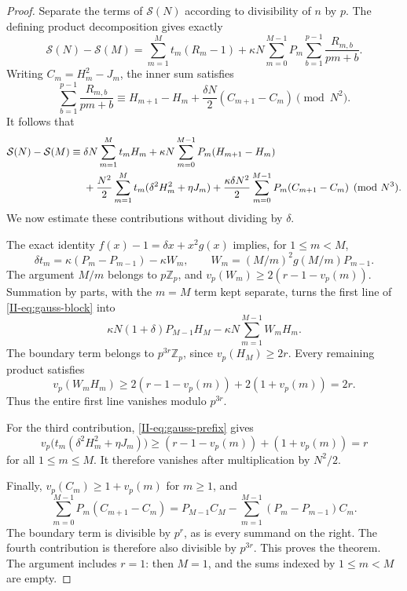 \documentclass[11pt,letterpaper]{article}
\numberwithin{equation}{section}
\begin{document}
\begin{proof}
Separate the terms of $\mathcal S(N)$ according to divisibility of
$n$ by $p$. The defining product decomposition gives exactly
\[
\mathcal S(N)-\mathcal S(M)
=\sum_{m=1}^{M}t_m(R_m-1)
+\kappa N\sum_{m=0}^{M-1}P_m
 \sum_{b=1}^{p-1}\frac{R_{m,b}}{pm+b}.
\]
Writing $C_m=H_m^2-J_m$, the inner sum satisfies
\[
\sum_{b=1}^{p-1}\frac{R_{m,b}}{pm+b}
\equiv H_{m+1}-H_m+\frac{\delta N}{2}(C_{m+1}-C_m)
\pmod{N^2}.
\]
It follows that
\begin{align}\label{II-eq:gauss-block}
\mathcal S(N)-\mathcal S(M)\equiv{}&
\delta N\sum_{m=1}^{M}t_mH_m
+\kappa N\sum_{m=0}^{M-1}P_m(H_{m+1}-H_m)\notag\\
&+\frac{N^2}{2}\sum_{m=1}^{M}t_m(\delta^2H_m^2+\eta J_m)
+\frac{\kappa\delta N^2}{2}
 \sum_{m=0}^{M-1}P_m(C_{m+1}-C_m)
\pmod{N^3}.
\end{align}
We now estimate these contributions without dividing by $\delta$.

The exact identity $f(x)-1=\delta x+x^2g(x)$ implies,
for $1\leq m<M$,
\[
\delta t_m
=\kappa(P_m-P_{m-1})-\kappa W_m,
\qquad
W_m=(M/m)^2g(M/m)P_{m-1}.
\]
The argument $M/m$ belongs to $p\mathbb Z_p$, and
$v_p(W_m)\geq2(r-1-v_p(m))$. Summation by parts, with the
$m=M$ term kept separate, turns the first line of
\eqref{II-eq:gauss-block} into
\[
\kappa N(1+\delta)P_{M-1}H_M
-\kappa N\sum_{m=1}^{M-1}W_mH_m.
\]
The boundary term belongs to $p^{3r}\mathbb Z_p$, since
$v_p(H_M)\geq2r$. Every remaining product satisfies
\[
v_p(W_mH_m)\geq2(r-1-v_p(m))+2(1+v_p(m))=2r.
\]
Thus the entire first line vanishes modulo $p^{3r}$.

For the third contribution, \eqref{II-eq:gauss-prefix} gives
\[
v_p\bigl(t_m(\delta^2H_m^2+\eta J_m)\bigr)
\geq(r-1-v_p(m))+(1+v_p(m))=r
\]
for all $1\leq m\leq M$. It therefore vanishes after multiplication
by $N^2/2$.

Finally, $v_p(C_m)\geq1+v_p(m)$ for $m\geq1$, and
\[
\sum_{m=0}^{M-1}P_m(C_{m+1}-C_m)
=P_{M-1}C_M-
 \sum_{m=1}^{M-1}(P_m-P_{m-1})C_m.
\]
The boundary term is divisible by $p^r$, as is every summand on the
right. The fourth contribution is therefore also divisible by
$p^{3r}$. This proves the theorem. The argument includes $r=1$:
then $M=1$, and the sums indexed by $1\leq m<M$ are empty.
\end{proof}
\end{document}
